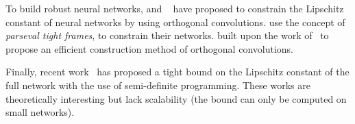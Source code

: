 To build robust neural networks, \citet{cisse2017parseval} and ~\citet{NIPS2019_9673} have proposed to constrain the Lipschitz constant of neural networks by using orthogonal convolutions.
\citet{cisse2017parseval} use the concept of \emph{parseval tight frames}, to constrain their networks.
\citet{NIPS2019_9673} built upon the work of~\citet{cisse2017parseval} to propose an efficient construction method of orthogonal convolutions.  

Finally, recent work~\citet{NIPS2019_9319,latorre2020lipschitz} has proposed a tight bound on the Lipschitz constant of the full network with the use of semi-definite programming.
These works are theoretically interesting but lack scalability (\ie the bound can only be computed on small networks).



